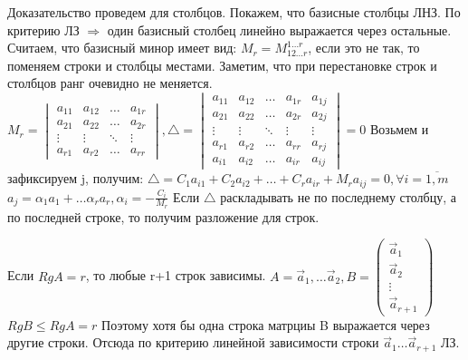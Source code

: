 \documentclass[12pt]{article}
\begin{document}
    Доказательство проведем для столбцов. \newline
    Покажем, что базисные столбцы ЛНЗ. \newline
    По критерию ЛЗ $\Rightarrow$ один базисный столбец линейно выражается через остальные. \newline
    Считаем, что базисный минор имеет вид: \newline
    $M_r = M_{12\dots r}^{1\dots r}$, если это не так, то поменяем строки и столбцы местами. \newline
    Заметим, что при перестановке строк и столбцов ранг очевидно не меняется. \newline
    $M_r = \begin{vmatrix}
        a_{11} & a_{12} & \dots & a_{1r} \\
        a_{21} & a_{22} & \dots & a_{2r} \\
        \vdots & \vdots & \ddots & \vdots \\
        a_{r1} & a_{r2} & \dots & a_{rr}
    \end{vmatrix}, \triangle = \begin{vmatrix}
        a_{11} & a_{12} & \dots & a_{1r} & a_{1j} \\
        a_{21} & a_{22} & \dots & a_{2r} & a_{2j} \\
        \vdots & \vdots & \ddots & \vdots & \vdots \\
        a_{r1} & a_{r2} & \dots & a_{rr} & a_{rj} \\
        a_{i1} & a_{i2} & \dots & a_{ir} & a_{ij}
    \end{vmatrix} = 0$
    Возьмем и зафиксируем j, получим: \newline
    $\triangle = C_1 a_{i1} + C_2a_{i2} + \dots + C_ra_{ir} + M_r a_{ij} = 0, \forall i = \overline{1, m}$
    $a_j = \alpha_1 a_1 + \dots \alpha_r a_r, \alpha_i = -\frac{C_i}{M_r}$ \newline
    Если $\triangle$ раскладывать не по последнему столбцу, а по последней строке, то получим разложение для строк. \newline

    Если $RgA = r$, то любые r+1 строк зависимы. \newline
    $A = \vec a_1, \dots \vec a_2, B = \begin{pmatrix}
        \vec a_1 \\
        \vec a_2 \\
        \vdots \\
        \vec a_{r+1}
    \end{pmatrix}$ \newline
    $Rg B \leq Rg A = r$ \newline
    Поэтому хотя бы одна строка матрциы B выражается через другие строки. \newline
    Отсюда по критерию линейной зависимости строки $\vec a_1 \dots \vec a_{r+1}$ ЛЗ. \newline
\end{document}
